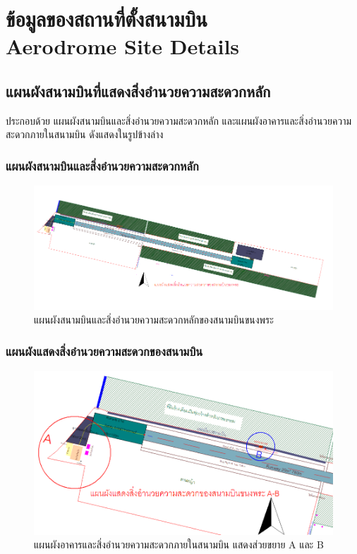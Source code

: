 
\chapter{ข้อมูลของสถานที่ตั้งสนามบิน \\
Aerodrome Site Details}

\section{แผนผังสนามบินที่แสดงสิ่งอำนวยความสะดวกหลัก}

ประกอบด้วย แผนผังสนามบินและสิ่งอำนวยความสะดวกหลัก และแผนผังอาคารและสิ่งอำนวยความสะดวกภายในสนามบิน ดังแสดงในรูปข้างล่าง

\subsection{แผนผังสนามบินและสิ่งอำนวยความสะดวกหลัก}

\begin{figure}[ht!]
\begin{center}
\includegraphics[scale=1.0]{Picture1.png}
\caption{แผนผังสนามบินและสิ่งอำนวยความสะดวกหลักของสนามบินขนงพระ}
\label{default}
\end{center}
\end{figure}

\newpage
\subsection{แผนผังแสดงสิ่งอำนวยความสะดวกของสนามบิน}

\begin{figure}[h!]
\begin{center}
\includegraphics[scale=0.75]{Picture2.png}
\caption{แผนผังอาคารและสิ่งอำนวยความสะดวกภายในสนามบิน แสดงส่วยขยาย A และ B}
\label{default}
\end{center}
\end{figure}


